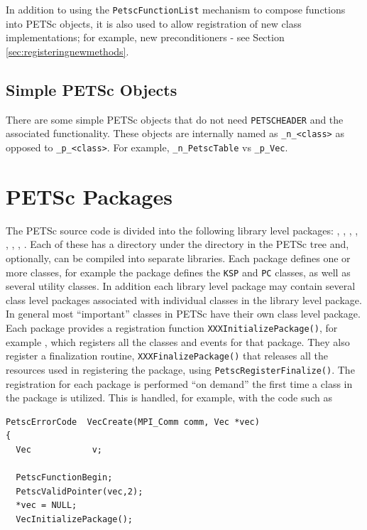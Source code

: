 In addition to using the \lstinline{PetscFunctionList} mechanism to compose functions into PETSc objects, it is also used to allow registration of new class implementations; for example, new preconditioners - see Section \ref{sec:registeringnewmethods}.

\subsection{Simple PETSc Objects}

There are some simple PETSc objects that do not need \lstinline{PETSCHEADER} and
the associated functionality. These objects are internally named as
\lstinline{_n_<class>} as opposed to \lstinline{_p_<class>}. For example, \lstinline{_n_PetscTable}
vs \lstinline{_p_Vec}.

\section{PETSc Packages}

The PETSc source code is divided into the following
library level packages: , , , , , , , . Each
of these has a directory under the  directory in the PETSc
tree and, optionally, can be compiled into separate libraries. Each
package defines one or more classes, for example the  package
defines the \lstinline{KSP} and \lstinline{PC} classes, as well as several utility
classes. In addition each library level package may contain several class level packages associated with individual classes in the library level package. In general most ``important'' classes in PETSc have their own class level package.
Each package provides a registration
function \lstinline{XXXInitializePackage()}, for
example , which registers all the classes
and events for that package. They also register a finalization
routine, \lstinline{XXXFinalizePackage()} that releases all the
resources used in registering the package,
using \lstinline{PetscRegisterFinalize()}. The registration for each package is performed ``on demand'' the first time a class in the package is utilized. This is handled, for example, with the code such as
\begin{lstlisting}
PetscErrorCode  VecCreate(MPI_Comm comm, Vec *vec)
{
  Vec            v;

  PetscFunctionBegin;
  PetscValidPointer(vec,2);
  *vec = NULL;
  VecInitializePackage();
\end{lstlisting}



